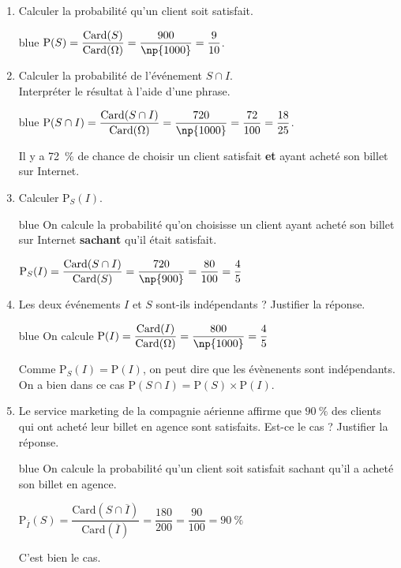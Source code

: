 	\begin{enumerate}
		\item Calculer la probabilité qu'un client soit satisfait.
		
		\begin{color}{blue}
	$\text{P}(S) = \dfrac{\text{Card}(S)}{\text{Card}(\Omega)} = \dfrac{900}{\np{1000}} = \dfrac{9}{10}$.
	\end{color}

		
		\item Calculer la probabilité de l'événement $S\cap I$. \\
		Interpréter le résultat à l'aide d'une phrase.
		
		\begin{color}{blue}
	$\text{P}(S\cap I) = \dfrac{\text{Card}(S\cap I)}{\text{Card}(\Omega)} = \dfrac{720}{\np{1000}} = \dfrac{72}{100} = \dfrac{18}{25}$.
	
	Il y a 72~\% de chance de choisir un client satisfait \textbf{et} ayant acheté son billet sur Internet. 
	\end{color}
		
		\item Calculer $\text{P}_{S}(I)$.
		
		\begin{color}{blue}
On calcule la probabilité qu'on choisisse un client ayant acheté son billet  sur Internet \textbf{sachant}	 qu'il était satisfait.
		
		$\text{P}_{S}(I)= \dfrac{\text{Card}(S\cap I)}{\text{Card}(S)} = \dfrac{720}{\np{900}} = \dfrac{80}{100} = \dfrac{4}{5}$
		
		\end{color}
		
		\item Les deux événements $I$ et $S$ sont-ils indépendants ? Justifier la réponse.
		
		\begin{color}{blue}
		On calcule $\text{P}(I) = \dfrac{\text{Card}(I)}{\text{Card}(\Omega)} = \dfrac{800}{\np{1000}} = \dfrac{4}{5}$
		
		Comme $\text{P}_{S}(I)=\text{P}(I)$, on peut dire que les évènenents sont indépendants. On a bien dans ce cas $\text{P}(S\cap I) = \text{P}(S) \times \text{P}(I)$.
		\end{color}
		\item Le service marketing de la compagnie aérienne affirme que $90~\%$ des clients qui ont acheté leur billet en agence sont satisfaits. Est-ce le cas ? Justifier la réponse.
		
		\begin{color}{blue}
		On calcule la probabilité qu'un client soit satisfait sachant qu'il a acheté son billet en agence.
		
		$\text{P}_{\overline{I}}(S) = \dfrac{\text{Card}(S\cap \overline{I})}{\text{Card}(\overline{I})} = \dfrac{180}{200} = \dfrac{90}{100} = 90~\%$
		
		C'est bien le cas.
		
		\end{color}
	\end{enumerate}
